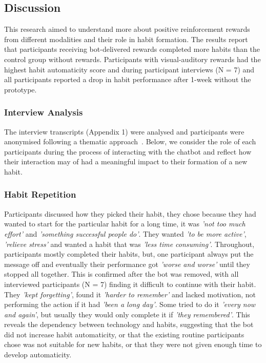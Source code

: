 \subsection{Discussion}
This research aimed to understand more about positive reinforcement rewards from different modalities and their role in habit formation. The results report that participants receiving bot-delivered rewards completed more habits than the control group without rewards. Participants with visual-auditory rewards had the highest habit automaticity score and during participant interviews (N = 7) and all participants reported a drop in habit performance after 1-week without the prototype.

\subsubsection{Interview Analysis}
The interview transcripts (Appendix 1) were analysed and participants were anonymised following a thematic approach~\cite{thematic_analysis_qualatitive_data}. Below, we consider the role of each participants during the process of interacting with the chatbot and reflect how their interaction may of had a meaningful impact to their formation of a new habit.

\subsubsection*{Habit Repetition}
Participants discussed how they picked their habit, they chose because they had wanted to start for the particular habit for a long time, it was \textit{'not too much effort'} and \textit{'something successful people do'}. They wanted \textit{'to be more active'}, \textit{'relieve stress'} and wanted a habit that was \textit{'less time consuming'}. Throughout, participants mostly completed their habits, but, one participant always put the message off and eventually their performance got \textit{'worse and worse'} until they stopped all together. This is confirmed after the bot was removed, with all interviewed participants (N = 7) finding it difficult to continue with their habit. They \textit{'kept forgetting'}, found it \textit{'harder to remember'} and lacked motivation, not performing the action if it had \textit{'been a long day'}. Some tried to do it \textit{'every now and again'}, but usually they would only complete it if \textit{'they remembered'}. This reveals the dependency between technology and habits, suggesting that the bot did not increase habit automaticity, or that the existing routine participants chose was not suitable for new habits, or that they were not given enough time to develop automaticity.

